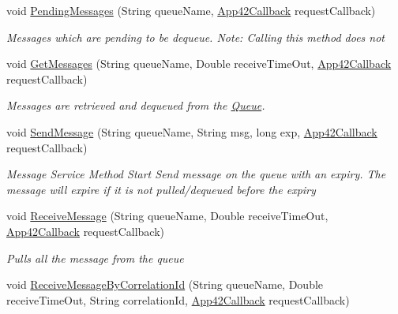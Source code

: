 \begin{DoxyCompactItemize}
void \hyperlink{classcom_1_1shephertz_1_1app42_1_1paas_1_1sdk_1_1windows_1_1message_1_1_queue_service_a6dee2b1d6d5b1c0ee0e0f7d30bf70fb9}{Pending\+Messages} (String queue\+Name, \hyperlink{interfacecom_1_1shephertz_1_1app42_1_1paas_1_1sdk_1_1windows_1_1_app42_callback}{App42\+Callback} request\+Callback)
\begin{DoxyCompactList}\small\item\em Messages which are pending to be dequeue. Note\+: Calling this method does not \end{DoxyCompactList}\item 
void \hyperlink{classcom_1_1shephertz_1_1app42_1_1paas_1_1sdk_1_1windows_1_1message_1_1_queue_service_a8d21c96e83c5b7cc283a6c04e0cc34a1}{Get\+Messages} (String queue\+Name, Double receive\+Time\+Out, \hyperlink{interfacecom_1_1shephertz_1_1app42_1_1paas_1_1sdk_1_1windows_1_1_app42_callback}{App42\+Callback} request\+Callback)
\begin{DoxyCompactList}\small\item\em Messages are retrieved and dequeued from the \hyperlink{classcom_1_1shephertz_1_1app42_1_1paas_1_1sdk_1_1windows_1_1message_1_1_queue}{Queue}. \end{DoxyCompactList}\item 
void \hyperlink{classcom_1_1shephertz_1_1app42_1_1paas_1_1sdk_1_1windows_1_1message_1_1_queue_service_af4c50ba5c7a2ff374f70f228e6626dde}{Send\+Message} (String queue\+Name, String msg, long exp, \hyperlink{interfacecom_1_1shephertz_1_1app42_1_1paas_1_1sdk_1_1windows_1_1_app42_callback}{App42\+Callback} request\+Callback)
\begin{DoxyCompactList}\small\item\em Message Service Method Start Send message on the queue with an expiry. The message will expire if it is not pulled/dequeued before the expiry \end{DoxyCompactList}\item 
void \hyperlink{classcom_1_1shephertz_1_1app42_1_1paas_1_1sdk_1_1windows_1_1message_1_1_queue_service_a5951dfc56c1a322f1222f67d14dcec7a}{Receive\+Message} (String queue\+Name, Double receive\+Time\+Out, \hyperlink{interfacecom_1_1shephertz_1_1app42_1_1paas_1_1sdk_1_1windows_1_1_app42_callback}{App42\+Callback} request\+Callback)
\begin{DoxyCompactList}\small\item\em Pulls all the message from the queue \end{DoxyCompactList}\item 
void \hyperlink{classcom_1_1shephertz_1_1app42_1_1paas_1_1sdk_1_1windows_1_1message_1_1_queue_service_a57051181c27b5973c55d876ea1feed59}{Receive\+Message\+By\+Correlation\+Id} (String queue\+Name, Double receive\+Time\+Out, String correlation\+Id, \hyperlink{interfacecom_1_1shephertz_1_1app42_1_1paas_1_1sdk_1_1windows_1_1_app42_callback}{App42\+Callback} request\+Callback)

\end{DoxyCompactItemize}
